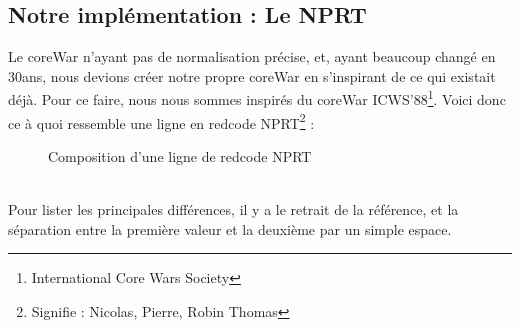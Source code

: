 \documentclass[a4paper,12pt]{article}
\begin{document}
\subsection{Notre implémentation : Le NPRT}
Le coreWar n'ayant pas de normalisation précise, et, ayant beaucoup changé en 30ans, nous devions créer notre propre coreWar en s'inspirant de ce qui existait déjà. Pour ce faire, nous nous sommes inspirés du coreWar ICWS’88\footnote{International Core Wars Society}. Voici donc ce à quoi ressemble une ligne en redcode NPRT\footnote{Signifie : Nicolas, Pierre, Robin Thomas} :
\begin{figure}[htpb]
\caption{Composition d'une ligne de redcode NPRT}
\end{figure}\\
Pour lister les principales différences, il y a le retrait de la référence, et la séparation entre la première valeur et la deuxième par un simple espace.
\end{document}
